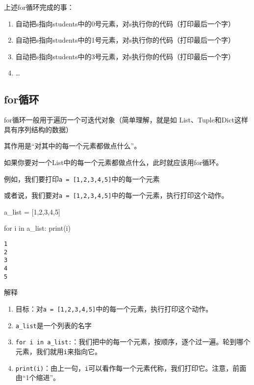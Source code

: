 \documentclass[
  letterpaper,
  DIV=11,
  numbers=noendperiod]{scrreprt}
\newenvironment{Shaded}{\begin{snugshade}}{\end{snugshade}}
\newcommand{\BuiltInTok}[1]{\textcolor[rgb]{0.00,0.23,0.31}{#1}}
\newcommand{\ControlFlowTok}[1]{\textcolor[rgb]{0.00,0.23,0.31}{#1}}
\newcommand{\DecValTok}[1]{\textcolor[rgb]{0.68,0.00,0.00}{#1}}
\newcommand{\KeywordTok}[1]{\textcolor[rgb]{0.00,0.23,0.31}{#1}}
\newcommand{\NormalTok}[1]{\textcolor[rgb]{0.00,0.23,0.31}{#1}}
\newcommand{\OperatorTok}[1]{\textcolor[rgb]{0.37,0.37,0.37}{#1}}
\providecommand{\tightlist}{%
  \setlength{\itemsep}{0pt}\setlength{\parskip}{0pt}}\usepackage{longtable,booktabs,array}
\begin{document}
上述for循环完成的事：

\begin{enumerate}
\def\labelenumi{\arabic{enumi}.}
\tightlist
\item
  自动把s指向students中的0号元素，对s执行你的代码（打印最后一个字）
\item
  自动把s指向students中的1号元素，对s执行你的代码（打印最后一个字）
\item
  自动把s指向students中的3号元素，对s执行你的代码（打印最后一个字）
\item
  \ldots{}
\end{enumerate}

\hypertarget{forux5faaux73af-1}{%
\subsection{for循环}\label{forux5faaux73af-1}}

for循环一般用于遍历一个可迭代对象（简单理解，就是如
List、Tuple和Dict这样具有序列结构的数据）

其作用是``对其中的每一个元素都做点什么''。

如果你要对一个List中的每一个元素都做点什么，此时就应该用for循环。

例如，我们要打印\texttt{a\ =\ {[}1,2,3,4,5{]}}中的每一个元素

或者说，我们要对\texttt{a\ =\ {[}1,2,3,4,5{]}}中的每一个元素，执行打印这个动作。

\begin{Shaded}
\begin{Highlighting}[]
\NormalTok{a\_list }\OperatorTok{=}\NormalTok{ [}\DecValTok{1}\NormalTok{,}\DecValTok{2}\NormalTok{,}\DecValTok{3}\NormalTok{,}\DecValTok{4}\NormalTok{,}\DecValTok{5}\NormalTok{]}

\ControlFlowTok{for}\NormalTok{ i }\KeywordTok{in}\NormalTok{ a\_list:  }
    \BuiltInTok{print}\NormalTok{(i)}
\end{Highlighting}
\end{Shaded}

\begin{verbatim}
1
2
3
4
5
\end{verbatim}

解释

\begin{enumerate}
\def\labelenumi{\arabic{enumi}.}
\tightlist
\item
  目标：对\texttt{a\ =\ {[}1,2,3,4,5{]}}中的每一个元素，执行打印这个动作。
\item
  \texttt{a\_list}是一个列表的名字
\item
  \texttt{for\ i\ in\ a\_list:}：我们把中的每一个元素，按顺序，逐个过一遍。轮到哪个元素，我们就用\texttt{i}来指向它。
\item
  \texttt{print(i)}：由上一句，\texttt{i}可以看作每一个元素代称，我们打印它。注意，前面由``1个缩进''。
\end{enumerate}
\end{document}
